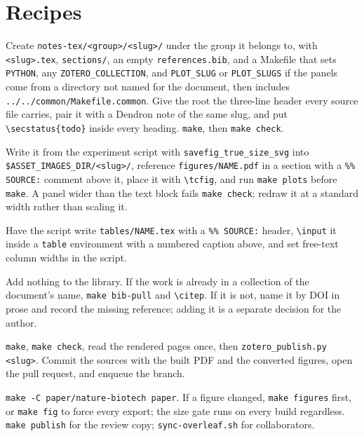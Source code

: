 
\section{Recipes}
\label{sec:recipes}

Create \texttt{notes-tex/<group>/<slug>/} under the group it belongs to, with \texttt{<slug>.tex}, \texttt{sections/},
an empty \texttt{references.bib}, and a Makefile that sets \texttt{PYTHON}, any
\texttt{ZOTERO\_COLLECTION}, and \texttt{PLOT\_SLUG} or \texttt{PLOT\_SLUGS} if the
panels come from a directory not named for the document, then includes
\texttt{../../common/Makefile.common}. Give the root the three-line header every
source file carries, pair it with a Dendron note of the same slug, and put
\texttt{\textbackslash secstatus\{todo\}} inside every heading. \texttt{make}, then
\texttt{make check}.

Write it from the experiment script with \texttt{savefig\_true\_size\_svg} into
\texttt{\$ASSET\_IMAGES\_DIR/<slug>/}, reference \texttt{figures/{}NAME.pdf} in a
section with a \texttt{\%\% SOURCE:} comment above it, place it with
\texttt{\textbackslash tcfig}, and run \texttt{make plots} before \texttt{make}. A
panel wider than the text block fails \texttt{make check}; redraw it at a standard
width rather than scaling it.

Have the script write \texttt{tables/NAME.tex} with a \texttt{\%\% SOURCE:} header,
\texttt{\textbackslash input} it inside a \texttt{table} environment with a
numbered caption above, and set free-text column widths in the script.

Add nothing to the library. If the work is already in a collection of the
document's name, \texttt{make bib-pull} and \texttt{\textbackslash citep}. If it is
not, name it by DOI in prose and record the missing reference; adding it is a
separate decision for the author.

\texttt{make}, \texttt{make check}, read the rendered pages once, then
\texttt{zotero\_publish.py <slug>}. Commit the sources with the built PDF and the
converted figures, open the pull request, and enqueue the branch.

\texttt{make -C paper/nature-biotech paper}. If a figure changed, \texttt{make
figures} first, or \texttt{make fig} to force every export; the size gate runs on
every build regardless. \texttt{make publish} for the review copy;
\texttt{sync-overleaf.sh} for collaborators.
